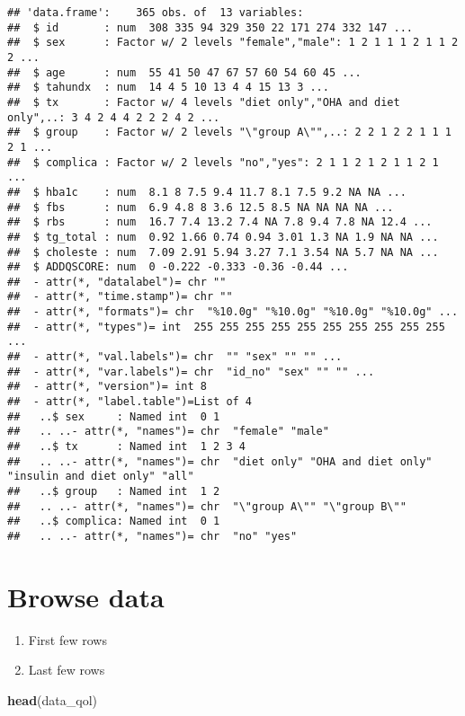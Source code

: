 \documentclass[]{book}
\newenvironment{Shaded}{\begin{snugshade}}{\end{snugshade}}
\newcommand{\KeywordTok}[1]{\textcolor[rgb]{0.13,0.29,0.53}{\textbf{#1}}}
\newcommand{\NormalTok}[1]{#1}
\providecommand{\tightlist}{%
  \setlength{\itemsep}{0pt}\setlength{\parskip}{0pt}}
\theoremstyle{definition}
\theoremstyle{definition}
\theoremstyle{remark}
\begin{document}
\begin{verbatim}
## 'data.frame':    365 obs. of  13 variables:
##  $ id       : num  308 335 94 329 350 22 171 274 332 147 ...
##  $ sex      : Factor w/ 2 levels "female","male": 1 2 1 1 1 2 1 1 2 2 ...
##  $ age      : num  55 41 50 47 67 57 60 54 60 45 ...
##  $ tahundx  : num  14 4 5 10 13 4 4 15 13 3 ...
##  $ tx       : Factor w/ 4 levels "diet only","OHA and diet only",..: 3 4 2 4 4 2 2 2 4 2 ...
##  $ group    : Factor w/ 2 levels "\"group A\"",..: 2 2 1 2 2 1 1 1 2 1 ...
##  $ complica : Factor w/ 2 levels "no","yes": 2 1 1 2 1 2 1 1 2 1 ...
##  $ hba1c    : num  8.1 8 7.5 9.4 11.7 8.1 7.5 9.2 NA NA ...
##  $ fbs      : num  6.9 4.8 8 3.6 12.5 8.5 NA NA NA NA ...
##  $ rbs      : num  16.7 7.4 13.2 7.4 NA 7.8 9.4 7.8 NA 12.4 ...
##  $ tg_total : num  0.92 1.66 0.74 0.94 3.01 1.3 NA 1.9 NA NA ...
##  $ choleste : num  7.09 2.91 5.94 3.27 7.1 3.54 NA 5.7 NA NA ...
##  $ ADDQSCORE: num  0 -0.222 -0.333 -0.36 -0.44 ...
##  - attr(*, "datalabel")= chr ""
##  - attr(*, "time.stamp")= chr ""
##  - attr(*, "formats")= chr  "%10.0g" "%10.0g" "%10.0g" "%10.0g" ...
##  - attr(*, "types")= int  255 255 255 255 255 255 255 255 255 255 ...
##  - attr(*, "val.labels")= chr  "" "sex" "" "" ...
##  - attr(*, "var.labels")= chr  "id_no" "sex" "" "" ...
##  - attr(*, "version")= int 8
##  - attr(*, "label.table")=List of 4
##   ..$ sex     : Named int  0 1
##   .. ..- attr(*, "names")= chr  "female" "male"
##   ..$ tx      : Named int  1 2 3 4
##   .. ..- attr(*, "names")= chr  "diet only" "OHA and diet only" "insulin and diet only" "all"
##   ..$ group   : Named int  1 2
##   .. ..- attr(*, "names")= chr  "\"group A\"" "\"group B\""
##   ..$ complica: Named int  0 1
##   .. ..- attr(*, "names")= chr  "no" "yes"
\end{verbatim}

\section{Browse data}\label{browse-data}

\begin{enumerate}
\def\labelenumi{\arabic{enumi}.}
\tightlist
\item
  First few rows
\item
  Last few rows
\end{enumerate}

\begin{Shaded}
\begin{Highlighting}[]
\KeywordTok{head}\NormalTok{(data_qol)}
\end{Highlighting}
\end{Shaded}
\end{document}
